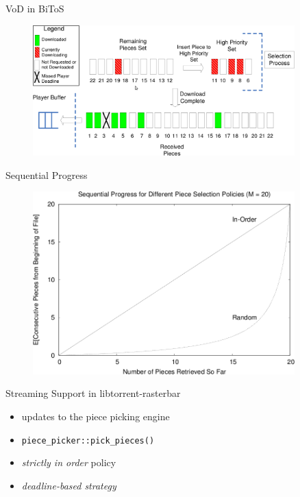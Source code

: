 \documentclass{beamer}
\begin{document}
\begin{frame}{VoD in BiToS}
  \begin{figure}
    \includegraphics[width=0.9\textwidth]{img/bitos-vod}
  \end{figure}
\end{frame}

\begin{frame}{Sequential Progress}
  \begin{figure}
    \includegraphics[width=0.9\textwidth]{img/sequential-progress}
  \end{figure}
\end{frame}

\begin{frame}{Streaming Support in libtorrent-rasterbar}
  \begin{itemize}
    \item updates to the piece picking engine
    \item \texttt{piece\_picker::pick\_pieces()}
    \item \textit{strictly in order} policy
    \item \textit{deadline-based strategy}
  \end{itemize}
\end{frame}
\end{document}
